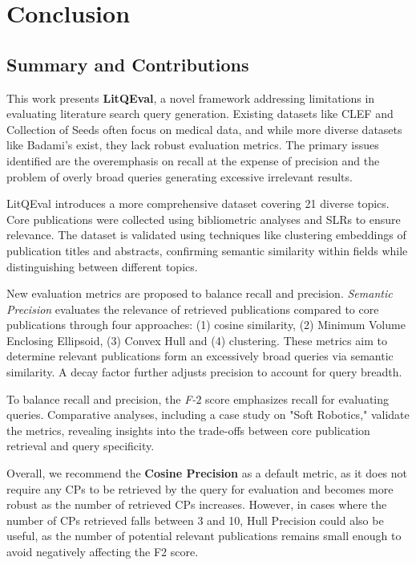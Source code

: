 {\let\clearpage\relax \chapter{Conclusion}\label{ch:conclusion}}

\section{Summary and Contributions}
This work presents \textbf{LitQEval}, a novel framework addressing limitations in evaluating literature search query generation. Existing datasets like CLEF and Collection of Seeds often focus on medical data, and while more diverse datasets like Badami’s \autocite{badami2023adaptive} exist, they lack robust evaluation metrics. The primary issues identified are the overemphasis on recall at the expense of precision and the problem of overly broad queries generating excessive irrelevant results. 

LitQEval introduces a more comprehensive dataset covering 21 diverse topics. Core publications were collected using bibliometric analyses and SLRs to ensure relevance. The dataset is validated using techniques like clustering embeddings of publication titles and abstracts, confirming semantic similarity within fields while distinguishing between different topics.

New evaluation metrics are proposed to balance recall and precision. \textit{Semantic Precision} evaluates the relevance of retrieved publications compared to core publications through four approaches: (1) cosine similarity, (2) Minimum Volume Enclosing Ellipsoid, (3) Convex Hull and (4) clustering. These metrics aim to determine relevant publications form an excessively broad queries via semantic similarity. A decay factor further adjusts precision to account for query breadth.

To balance recall and precision, the \textit{ F-$2$ } score emphasizes recall for evaluating queries. Comparative analyses, including a case study on "Soft Robotics," validate the metrics, revealing insights into the trade-offs between core publication retrieval and query specificity.

Overall, we recommend the \textbf{Cosine Precision} as a default metric, as it does not require any CPs to be retrieved by the query for evaluation and becomes more robust as the number of retrieved CPs increases. However, in cases where the number of CPs retrieved falls between 3 and 10, Hull Precision could also be useful, as the number of potential relevant publications remains small enough to avoid negatively affecting the F2 score.

